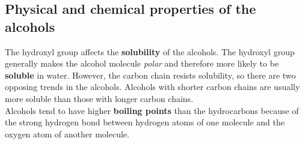 
\subsection{Physical and chemical properties of the alcohols}
\label{sec:om:physchem}

The hydroxyl group affects the \textbf{solubility} of the alcohols. The hydroxyl group generally makes the alcohol molecule \textit{polar} and therefore more likely to be \textbf{soluble} in water. However, the carbon chain resists solubility, so there are two opposing trends in the alcohols. Alcohols with shorter carbon chains are usually more soluble than those with longer carbon chains.\\

Alcohols tend to have higher \textbf{boiling points} than the hydrocarbons because of the strong hydrogen bond between hydrogen atoms of one molecule and the oxygen atom of another molecule. \\

